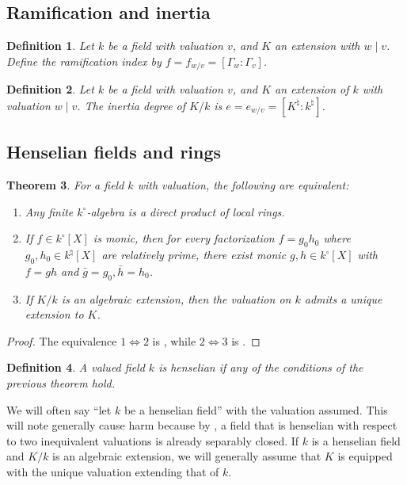 \documentclass{article}
\newtheorem{definition}{Definition}
\newtheorem{theorem}[definition]{Theorem}
\numberwithin{definition}{subsection}
\begin{document}
\subsection{Ramification and inertia}

\begin{definition}
Let $k$ be a field with valuation $v$, and $K$ an extension with $w\mid v$. 
Define the \emph{ramification index} by $f = f_{w/v} = [\Gamma_w:\Gamma_v]$. 
\end{definition} 

\begin{definition}
Let $k$ be a field with valuation $v$, and $K$ an extension of $k$ with 
valuation $w\mid v$. The \emph{inertia degree} of $K/k$ is 
$e = e_{w/v} = [K^\natural:k^\natural]$. 
\end{definition}





\subsection{Henselian fields and rings}

\begin{theorem}\label{henselian-defs}
For a field $k$ with valuation, the following are equivalent:
\begin{enumerate}
  \item Any finite $k^\circ$-algebra is a direct product of local rings. 
  \item If $f\in k^\circ[X]$ is monic, then for every factorization 
    $f=g_0 h_0$ where $g_0,h_0\in k^\natural[X]$ are relatively prime, there 
    exist monic $g,h\in k^\circ[X]$ with $f = g h$ and 
    $\bar g=g_0,\bar h=h_0$. 
  \item If $K/k$ is an algebraic extension, then the valuation on $k$ admits a 
    unique extension to $K$. 
\end{enumerate}
\end{theorem}
\begin{proof}
The equivalence $1\Leftrightarrow 2$ is \cite[III.4 ex.3]{Bou}, while 
$2\Leftrightarrow 3$ is \cite[II.6.6]{Neu}. 
\end{proof}

\begin{definition}
A valued field $k$ is \emph{henselian} if any of the conditions of the 
previous theorem hold. 
\end{definition}

We will often say ``let $k$ be a henselian field'' with the valuation assumed. 
This will note generally cause harm because by \cite[II.6 ex.3]{Neu}, a field 
that is henselian with respect to two inequivalent valuations is already 
separably closed. If $k$ is a henselian field and $K/k$ is an algebraic 
extension, we will generally assume that $K$ is equipped with the unique 
valuation extending that of $k$.
\end{document}
